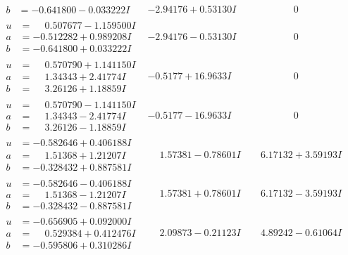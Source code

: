 \documentclass[1p]{elsarticle_modified}
\theoremstyle{definition}
\begin{document}
$$\begin{array}{c|c|c}
\begin{aligned}
b &= -0.641800 - 0.033222 I\end{aligned}
 & -2.94176 + 0.53130 I & \phantom{-0.000000 } 0 \\ \hline\begin{aligned}
u &= \phantom{-}0.507677 - 1.159500 I \\
a &= -0.512282 + 0.989208 I \\
b &= -0.641800 + 0.033222 I\end{aligned}
 & -2.94176 - 0.53130 I & \phantom{-0.000000 } 0 \\ \hline\begin{aligned}
u &= \phantom{-}0.570790 + 1.141150 I \\
a &= \phantom{-}1.34343 + 2.41774 I \\
b &= \phantom{-}3.26126 + 1.18859 I\end{aligned}
 & -0.5177 + 16.9633 I & \phantom{-0.000000 } 0 \\ \hline\begin{aligned}
u &= \phantom{-}0.570790 - 1.141150 I \\
a &= \phantom{-}1.34343 - 2.41774 I \\
b &= \phantom{-}3.26126 - 1.18859 I\end{aligned}
 & -0.5177 - 16.9633 I & \phantom{-0.000000 } 0 \\ \hline\begin{aligned}
u &= -0.582646 + 0.406188 I \\
a &= \phantom{-}1.51368 + 1.21207 I \\
b &= -0.328432 + 0.887581 I\end{aligned}
 & \phantom{-}1.57381 - 0.78601 I & \phantom{-}6.17132 + 3.59193 I \\ \hline\begin{aligned}
u &= -0.582646 - 0.406188 I \\
a &= \phantom{-}1.51368 - 1.21207 I \\
b &= -0.328432 - 0.887581 I\end{aligned}
 & \phantom{-}1.57381 + 0.78601 I & \phantom{-}6.17132 - 3.59193 I \\ \hline\begin{aligned}
u &= -0.656905 + 0.092000 I \\
a &= \phantom{-}0.529384 + 0.412476 I \\
b &= -0.595806 + 0.310286 I\end{aligned}
 & \phantom{-}2.09873 - 0.21123 I & \phantom{-}4.89242 - 0.61064 I \\ \hline\begin{aligned}

\end{aligned}
\end{array}$$
\end{document}
